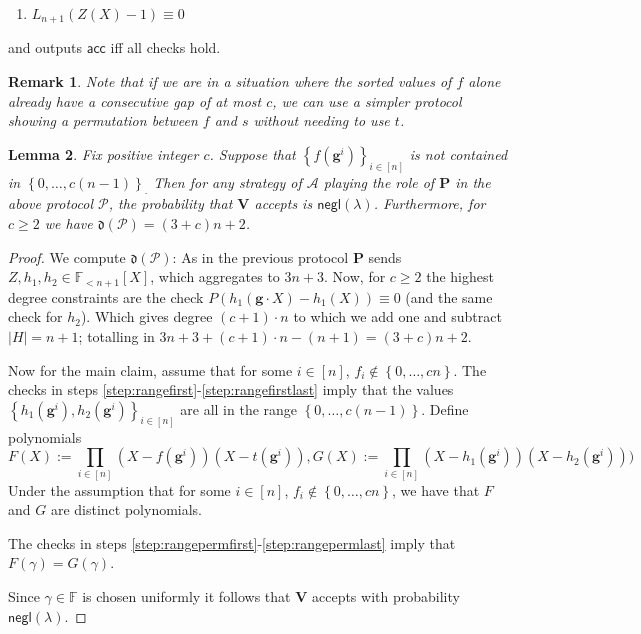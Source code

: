 \documentclass[11pt]{article} %
\newcommand{\F}{\ensuremath{\mathbb F}\xspace}
\newcommand{\adv}{\ensuremath{\mathcal A}\xspace}
\newcommand{\negl}{\ensuremath{\mathsf{negl}(\lambda)}\xspace}
\newcommand{\acc}{\ensuremath{\mathsf{acc}}\xspace}
\newcommand{\defeq}{:=}
\newcommand{\sett}[2]{\ensuremath{\set{#1}_{#2}}\xspace}
\newcommand{\prv}{\ensuremath{\mathsf{\mathbf{P}}}\xspace}
\newcommand{\prvpoly}{\ensuremath{\prv}\xspace}
\newcommand{\verpoly}{\ensuremath{\ver}\xspace}%
\newcommand{\ver}{\ensuremath{\mathsf{\mathbf{V}}}\xspace}
\newcommand{\set}[1]{\ensuremath{\left\{#1\right\}}\xspace}
\newcommand{\hgen}{\ensuremath{\mathbf{g}}\xspace}
\newcommand{\polysofdeg}[1]{\ensuremath{\F_{< #1}[X]}\xspace}
\newcommand{\prot}{\ensuremath{\mathscr{P}}\xspace}
\newcommand{\aggdeg}[1]{\ensuremath{\mathfrak{d}(#1)}\xspace}
\newtheorem{lemma}{Lemma}[section]
\newtheorem{remark}[lemma]{Remark}
\newcommand{\sone}{\ensuremath{ h_1}\xspace}
\newcommand{\stwo}{\ensuremath{ h_{2}}\xspace}
\begin{document}
\begin{enumerate}
\begin{enumerate}
\item \label{step:rangepermlast}$L_{n+1}(Z(X)-1)\equiv 0$
 
 \end{enumerate}

 and outputs \acc iff all checks hold.
\end{enumerate}
\begin{remark}
 Note that if we are in a situation where the sorted values of $f$ alone already have a consecutive gap of at most $c$, we can use a simpler protocol showing a permutation between $f$ and $s$ without needing to use $t$.
\end{remark}



\begin{lemma}\label{lem:rangeprot}
Fix positive integer $c$.
 Suppose that $\sett{f(\hgen^i)}{i\in [n]}$ is not contained in  \sett{0,\ldots,c(n-1)}.
 Then for any strategy of \adv playing the role of \prvpoly in the above protocol \prot, the probability that \verpoly accepts is \negl.
 Furthermore, for $c\geq 2$ we have $\aggdeg{\prot} = (3+c)n+2$.
\end{lemma}


\begin{proof}
 We compute \aggdeg{\prot}:
 As in the previous protocol \prv sends $Z,\sone,\stwo \in \polysofdeg{n+1}$,
 which aggregates to $3n+3$.
 Now, for $c\geq 2$ the highest degree constraints are the check
 $P\left(\sone(\hgen\cdot X)- \sone(X)\right)\equiv 0$ (and the same check for \stwo).
 Which gives degree $(c+1)\cdot n$ to which we add one and subtract $|H|=n+1$;
 totalling in $3n+3+(c+1)\cdot n - (n+1) = (3+c)n+2$.
 
 Now for the main claim, assume that for some $i\in [n]$, $f_i \notin \set{0,\ldots,cn}$.
 The checks in steps \ref{step:rangefirst}-\ref{step:rangefirstlast} imply 
 that the values \sett{\sone(\hgen^i),\stwo(\hgen^i)}{i\in [n]} are all in the range \set{0,\ldots, c(n-1)}.
 Define polynomials 
 \[F(X) \defeq \prod_{i\in [n]} (X-f(\hgen^i))(X-t(\hgen^i)),
 G(X) \defeq \prod_{i\in [n]} (X-\sone(\hgen^i))(X-\stwo(\hgen^i)))
 \]
Under the assumption that for some $i\in [n]$, $f_i \notin \set{0,\ldots,cn}$,
we have that $F$ and $G$ are distinct polynomials.

The checks in steps \ref{step:rangepermfirst}-\ref{step:rangepermlast} imply
that $F(\gamma) = G(\gamma)$.

Since $\gamma \in \F$ is chosen uniformly it follows that \verpoly accepts with probability \negl.
 
 \end{proof}
\end{document}
